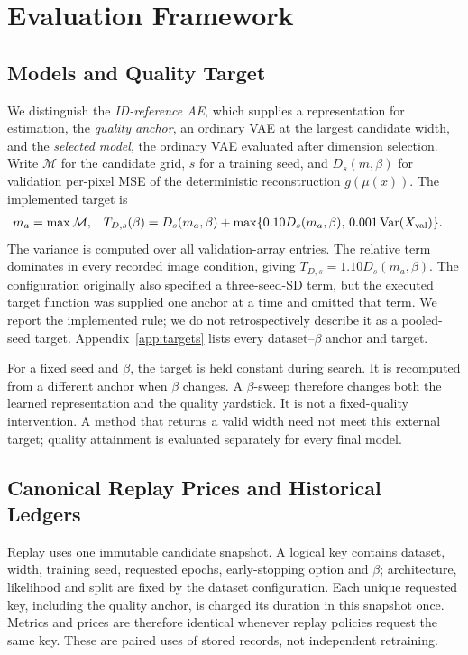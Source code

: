 \section{Evaluation Framework}\label{sec:framework}

\subsection{Models and Quality Target}\label{sec:quality}
We distinguish the \emph{ID-reference AE}, which supplies a representation
for estimation, the \emph{quality anchor}, an ordinary VAE at the largest
candidate width, and the \emph{selected model}, the ordinary VAE evaluated
after dimension selection. Write $\mathcal M$ for the candidate grid,
$s$ for a training seed, and $D_s(m,\beta)$ for validation per-pixel MSE
of the deterministic reconstruction $g(\mu(x))$. The implemented target is
\begin{align}
 m_a&=\max\mathcal M, &
 T_{D,s}(\beta)&=D_s(m_a,\beta)
 +\max\{0.10D_s(m_a,\beta),\,0.001\operatorname{Var}(X_{\rm val})\}.
 \label{eq:target}
\end{align}
The variance is computed over all validation-array entries. The relative
term dominates in every recorded image condition, giving
$T_{D,s}=1.10D_s(m_a,\beta)$. The configuration originally also specified a
three-seed-SD term, but the executed target function was supplied one
anchor at a time and omitted that term. We report the implemented rule;
we do not retrospectively describe it as a pooled-seed target.
Appendix~\ref{app:targets} lists every dataset--$\beta$ anchor and target.

For a fixed seed and $\beta$, the target is held constant during search.
It is recomputed from a different anchor when $\beta$ changes. A
$\beta$-sweep therefore changes both the learned representation and the
quality yardstick. It is not a fixed-quality intervention. A method that
returns a valid width need not meet this external target; quality
attainment is evaluated separately for every final model.

\subsection{Canonical Replay Prices and Historical Ledgers}\label{sec:cost}
Replay uses one immutable candidate snapshot. A logical key contains
dataset, width, training seed, requested epochs, early-stopping option and
$\beta$; architecture, likelihood and split are fixed by the dataset
configuration. Each unique requested key, including the quality anchor,
is charged its duration in this snapshot once. Metrics and prices are
therefore identical whenever replay policies request the same key.
These are paired uses of stored records, not independent retraining.

